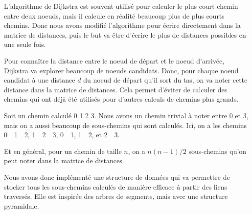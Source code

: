 L'algorithme de Dijkstra est souvent utilisé pour calculer le plus court chemin entre deux noeuds, mais il calcule en réalité beaucoup plus de plus courts chemins.
Donc nous avons modifié l'algorithme pour écrire directement dans la matrice de distances, puis le but va être d'écrire le plus de distances possibles en une seule fois.

Pour connaître la distance entre le noeud de départ et le noeud d'arrivée, Dijkstra va explorer beaucoup de noeuds candidats.
Donc, pour chaque noeud candidat à une distance $d$ du noeud de départ qu'il sort du tas, on va noter cette distance dans la matrice de distances.
Cela permet d'éviter de calculer des chemins qui ont déjà été utilisés pour d'autres calculs de chemins plus grands.

\label{subsub:subchemins}

Soit un chemin calculé 0  1  2  3.
Nous avons un chemin trivial à noter entre 0 et 3, mais on a aussi beaucoup de sous-chemins qui sont calculés.
Ici, on a les chemins 0~~1~~2, 1~~2~~3, 0~~1, 1~~2, et 2~~3.

Et en général, pour un chemin de taille $n$, on a $n(n-1)/2$ sous-chemins qu'on peut noter dans la matrice de distances.

Nous avons donc implémenté une structure de données qui va permettre de stocker tous les sous-chemins calculés de manière efficace à partir des liens traversés.
Elle est inspirée des arbres de segments\cite{segment_tree}, mais avec une structure pyramidale.

